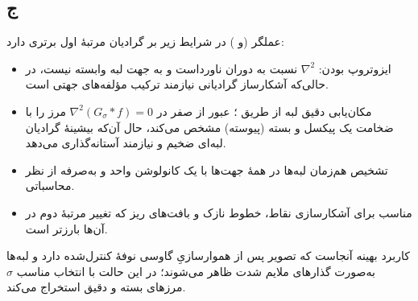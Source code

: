 \subsection*{ج}
عملگر
(و
)
در شرایط زیر بر گرادیان مرتبهٔ اول برتری دارد:
\begin{itemize}
    \item ایزوتروپ بودن: $\nabla^2$ نسبت به دوران ناورداست و به جهت لبه وابسته نیست، در حالی‌که آشکارساز گرادیانی نیازمند ترکیب مؤلفه‌های جهتی است.
    \item مکان‌یابی دقیق لبه از طریق
    ؛
    عبور از صفر در $\nabla^2 (G_\sigma * f)=0$ مرز را با ضخامت یک پیکسل و بسته (پیوسته) مشخص می‌کند، حال آن‌که بیشینهٔ گرادیان لبه‌ای ضخیم و نیازمند آستانه‌گذاری می‌دهد.
    \item تشخیص هم‌زمان لبه‌ها در همهٔ جهت‌ها با یک کانولوشن واحد و به‌صرفه از نظر محاسباتی.
    \item مناسب برای آشکارسازی نقاط، خطوط نازک و بافت‌های ریز که تغییر مرتبهٔ دوم در آن‌ها بارزتر است.
\end{itemize}
کاربرد بهینه آنجاست که تصویر پس از هموارسازیِ گاوسی نوفهٔ کنترل‌شده دارد و لبه‌ها به‌صورت گذارهای ملایم شدت ظاهر می‌شوند؛ در این حالت
با انتخاب مناسب $\sigma$ مرزهای بسته و دقیق استخراج می‌کند.